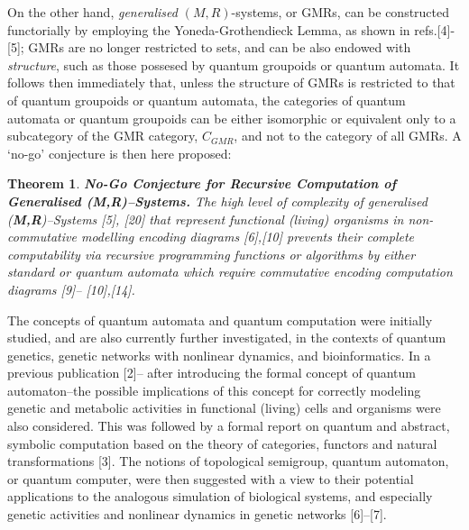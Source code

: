 \documentclass[12pt]{article}
\theoremstyle{plain}
\newtheorem{theorem}{Theorem}[section]
\theoremstyle{definition}
\numberwithin{equation}{section}
\begin{document}
On the other hand,  \emph{generalised}  $(M,R)$-systems, or GMRs, can be constructed functorially by employing the Yoneda-Grothendieck Lemma, as shown in refs.[4]-[5]; GMRs are no longer restricted to sets, and can be also endowed with \emph{structure}, such as those possesed by quantum groupoids or quantum automata.  It follows then immediately that, unless the structure of GMRs is restricted to that of quantum groupoids or quantum automata, the categories of quantum automata or quantum groupoids can be either isomorphic  or equivalent  only to a subcategory of the GMR category, $C_{GMR}$, and not to the category of all GMRs.  A `no-go' conjecture is then here proposed:


\begin{theorem} {\rm{\textbf{No-Go Conjecture for Recursive Computation of Generalised (\textbf{M,R})--Systems.} }}  
 \emph{The high level of complexity of generalised (\textbf{M,R})--Systems [5], [20] that represent functional (living) organisms in non-commutative modelling encoding diagrams [6],[10] prevents their complete computability \emph{via} recursive programming functions or algorithms by either standard or quantum automata which require commutative encoding computation diagrams [9]-- [10],[14]}.
\end{theorem}

 The concepts of quantum automata and quantum computation were initially studied, and are also currently further investigated, in the contexts of quantum genetics, genetic networks with nonlinear dynamics, and bioinformatics. In a previous publication [2]-- after introducing the formal concept of quantum automaton--the possible implications of this concept for correctly modeling genetic and metabolic activities in functional (living) cells and organisms were also considered. This was followed by a formal report on quantum and abstract, symbolic computation based on the theory of categories, functors and natural transformations [3]. The notions of topological semigroup, quantum automaton, or quantum computer, were then suggested with a view to their potential applications to the analogous simulation of biological systems, and especially genetic activities and nonlinear dynamics in genetic networks [6]--[7].
\end{document}
